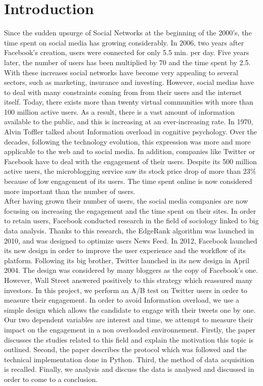 \chapter*{Introduction}

Since the sudden upsurge of Social Networks at the beginning of the 2000's, the time spent on social media
has growing considerably. In 2006, two years after Facebook's creation, users were connected for only 5.5
min. per day. Five years later, the number of users has been multiplied by 70 and the time spent by 2.5. With
these increases social networks have become very appealing to several sectors, such as marketing,
insurance and investing. However, social medias have to deal with many constraints coming from from their
users and the internet itself. Today, there exists more than twenty virtual communities with more than 100
million active users. As a result, there is a vast amount of information available to the public, and this is
increasing at an ever-increasing rate. In 1970, Alvin Toffler talked about Information overload in cognitive
psychology. Over the decades, following the technology evolution, this expression was more and more
applicable to the web and to social media. In addition, companies like Twitter or Facebook have to deal with
the engagement of their users. Despite its 500 million active users, the microblogging service saw its stock
price drop of more than 23\% because of low engagement of its users. The time spent online is now
considered more important than the number of users.\\
After having grown their number of users, the social media companies are now focusing on increasing the
engagement and the time spent on their sites. In order to retain users, Facebook conducted research in the
field of sociology linked to big data analysis. Thanks to this research, the EdgeRank algorithm was launched
in 2010, and was designed to optimize users News Feed. In 2012, Facebook launched its new design in
order to improve the user experience and the workflow of its platform. Following its big brother, Twitter
launched in its new design in April 2004. The design was considered by many bloggers as the copy of
Facebook's one. However, Wall Street answered positively to this strategy which reassured many investors.
In this project, we perform an A/B test on Twitter users in order to measure their engagement. In order to
avoid Information overload, we use a simple design which allows the candidate to engage with their tweets
one by one. Our two dependent variables are interest and time, we attempt to measure their impact on the
engagement in a non overloaded environnement.
Firstly, the paper discusses the studies related to this field and explain the motivation this topic is outlined.
Second, the paper describes the protocol which was followed and the technical implementation done in
Python. Third, the method of data acquisition is recalled. Finally, we analysis and discuss the data is
analysed and discussed in order to come to a conclusion.

